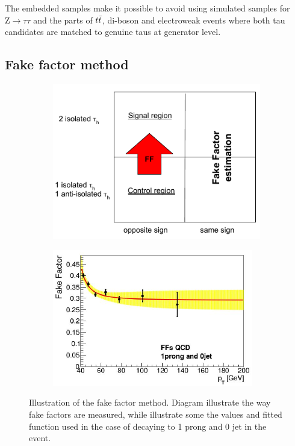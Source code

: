 The embedded samples make it possible to avoid using simulated samples for $\mathrm{Z}\rightarrow \tau\tau$ and the parts of $t\Bar{t}$, di-boson and electroweak events where both tau candidates are matched to genuine taus at generator level.

\subsection{Fake factor method}
\label{sec:ff}

\begin{figure}[htbp]
\centering
\begin{subfigure}[b]{0.5\textwidth}
  \centering
  \includegraphics[width=\textwidth]{Images/FF_method.png}
  \caption{\label{fig:FF_method}}
\end{subfigure}%
\begin{subfigure}[b]{0.5\textwidth}
  \centering
  \includegraphics[width=\textwidth]{Images/FF_values.png}
  \caption{\label{fig:FF_values}}
\end{subfigure}
\caption{Illustration of the fake factor method. Diagram  illustrate the way fake factors are measured, while  illustrate some the values and fitted function used in the case of \tauh decaying to 1 prong and 0 jet in the event.}
\label{fig:FF_illustration}
\end{figure}


